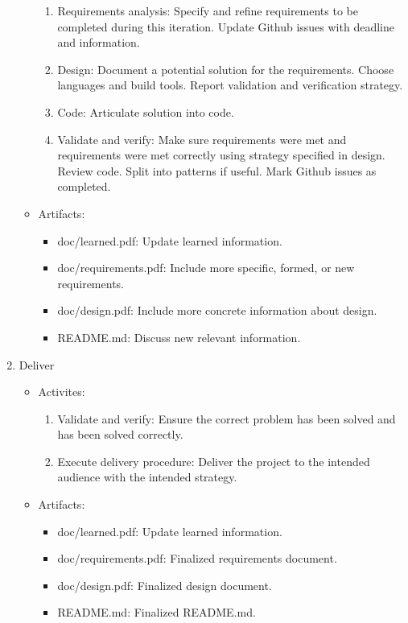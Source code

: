 \documentclass{article}
\begin{document}
\begin{enumerate}
\begin{itemize}
\begin{enumerate}
				\item Requirements analysis: Specify and refine
					requirements to be completed during this
					iteration. Update Github issues with
					deadline and information.
				\item Design: Document a potential solution for
					the requirements. Choose languages and
					build tools. Report validation and
					verification strategy.
				\item Code: Articulate solution into code.
				\item Validate and verify: Make sure
					requirements were met and requirements
					were met correctly using strategy
					specified in design. Review code. Split
					into patterns if useful. Mark Github
					issues as completed.
			\end{enumerate}
			\item Artifacts: \begin{itemize}
				\item doc/learned.pdf: Update learned
					information.
				\item doc/requirements.pdf: Include more
					specific, formed, or new requirements.
				\item doc/design.pdf: Include more concrete
					information about design.
				\item README.md: Discuss new relevant
					information.
			\end{itemize}
		\end{itemize}
	\item Deliver \begin{itemize}
		\item Activites: \begin{enumerate}
			\item Validate and verify: Ensure the correct problem
				has been solved and has been solved correctly.
			\item Execute delivery procedure: Deliver the project to
				the intended audience with the intended
				strategy.
		\end{enumerate}
		\item Artifacts: \begin{itemize}
			\item doc/learned.pdf: Update learned
				information.
			\item doc/requirements.pdf: Finalized requirements
				document.
			\item doc/design.pdf: Finalized design document.
			\item README.md: Finalized README.md.
		\end{itemize}
	\end{itemize}
\end{enumerate}
\end{document}
